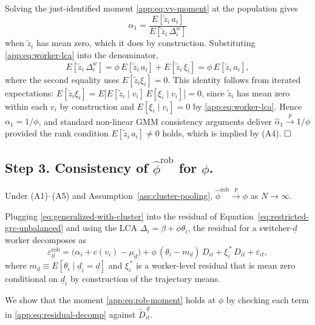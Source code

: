 Solving the just-identified moment \eqref{app:eq:vv-moment} at the population gives
\[
\alpha_1 = \frac{E[\tilde z_i\,a_i]}{E[\tilde z_i\,\Delta_i^w]}
\]
when $\tilde z_i$ has mean zero, which it does by construction.
Substituting \eqref{app:eq:worker-lca} into the denominator,
\[
E[\tilde z_i\,\Delta_i^w] = \phi\, E[\tilde z_i\,a_i] + E[\tilde z_i\,\xi_i] = \phi\, E[\tilde z_i\,a_i],
\]
where the second equality uses $E[\tilde z_i\xi_i] = 0$.
This identity follows from iterated expectations: $E[\tilde z_i\xi_i] = E\!\big[E[\tilde z_i \mid v_i]\,E[\xi_i\mid v_i]\big] = 0$, since $\tilde z_i$ has mean zero within each $v_i$ by construction and $E[\xi_i\mid v_i] = 0$ by \eqref{app:eq:worker-lca}.
Hence $\alpha_1 = 1/\phi$, and standard non-linear GMM consistency arguments \citep{hansen1982large} deliver $\hat\alpha_1 \xrightarrow{p} 1/\phi$ provided the rank condition $E[\tilde z_i\,a_i] \neq 0$ holds, which is implied by (A4). $\hfill\square$

\subsection*{Step 3.  Consistency of $\hat\phi^{\mathrm{rob}}$ for $\phi$.}

\begin{lemma}\label{app:lem:rob}
Under (A1)--(A5) and Assumption~\ref{ass:cluster-pooling}, $\hat\phi^{\mathrm{rob}} \xrightarrow{p} \phi$ as $N \to \infty$.
\end{lemma}

Plugging \eqref{eq:generalized-with-cluster} into the residual of Equation~\eqref{eq:restricted-grc-unbalanced} and using the LCA $\Delta_i = \beta + \phi\theta_i$, the residual for a switcher-$\underline d$ worker decomposes as
\begin{equation}\label{app:eq:residual-decomp}
\varepsilon_{it}^{\mathrm{rob}} = \big(\alpha_i + c(v_i) - \mu_{\underline d}\big) + \phi\,(\theta_i - m_{\underline d})\,D_{it} + \xi_i^{\,*}\,D_{it} + \varepsilon_{it},
\end{equation}
where $m_{\underline d} \equiv E[\theta_i\mid \underline d_i = \underline d]$ and $\xi_i^{\,*}$ is a worker-level residual that is mean zero conditional on $\underline d_i$ by construction of the trajectory means.

We show that the moment \eqref{app:eq:rob-moment} holds at $\phi$ by checking each term in \eqref{app:eq:residual-decomp} against $\tilde D_{it}^{\,\underline d}$.


